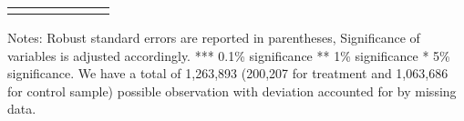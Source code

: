 \begin{sidewaystable}[!htbp]
{\begin{threeparttable}
\begin{tabular}{@{\extracolsep{5pt}}lD{.}{.}{-3} D{.}{.}{-3} D{.}{.}{-3} D{.}{.}{-3} D{.}{.}{-3} D{.}{.}{-3} }
\bottomrule \\[-1.8ex] 

\end{tabular} 

\begin{tablenotes}
  \LARGE
      Notes: Robust standard errors are reported in parentheses, Significance of variables is adjusted accordingly. *** 0.1\% significance ** 1\% significance * 5\% significance. We have a total of 1,263,893 (200,207 for treatment and 1,063,686 for control sample) possible observation with deviation accounted for by missing data.
\end{tablenotes}    



\end{threeparttable}
}
\end{sidewaystable} 